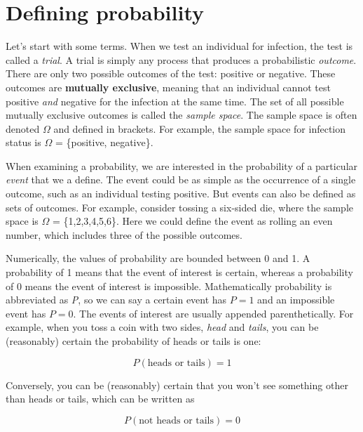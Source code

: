 \documentclass[
]{book}
\begin{document}
\section{Defining probability}\label{defining-probability}

Let's start with some terms. When we test an individual for infection, the test is called a \emph{trial}. A trial is simply any process that produces a probabilistic \emph{outcome}. There are only two possible outcomes of the test: positive or negative. These outcomes are \textbf{mutually exclusive}, meaning that an individual cannot test positive \emph{and} negative for the infection at the same time. The set of all possible mutually exclusive outcomes is called the \emph{sample space}. The sample space is often denoted \(\Omega\) and defined in brackets. For example, the sample space for infection status is \(\Omega\) = \{positive, negative\}.

When examining a probability, we are interested in the probability of a particular \emph{event} that we a define. The event could be as simple as the occurrence of a single outcome, such as an individual testing positive. But events can also be defined as sets of outcomes. For example, consider tossing a six-sided die, where the sample space is \(\Omega\) = \{1,2,3,4,5,6\}. Here we could define the event as rolling an even number, which includes three of the possible outcomes.

Numerically, the values of probability are bounded between 0 and 1. A probability of 1 means that the event of interest is certain, whereas a probability of 0 means the event of interest is impossible. Mathematically probability is abbreviated as \emph{P}, so we can say a certain event has \(P = 1\) and an impossible event has \(P = 0\). The events of interest are usually appended parenthetically. For example, when you toss a coin with two sides, \emph{head} and \emph{tails}, you can be (reasonably) certain the probability of heads or tails is one:

\[P(\text{heads or tails}) = 1\]

Conversely, you can be (reasonably) certain that you won't see something other than heads or tails, which can be written as

\[P(\text{not heads or tails}) = 0\]
\end{document}
